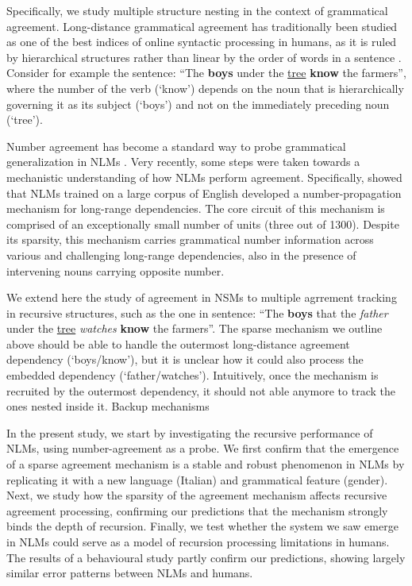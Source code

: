 Specifically, we study multiple structure nesting in the context of grammatical agreement. Long-distance grammatical agreement has traditionally been studied as one of the  best indices of online syntactic processing in humans, as it is ruled
by hierarchical structures rather than linear by the order of words in
a sentence \citep{Bock:Miller:1991, franck2002subject}. Consider for example the sentence: ``The \textbf{boys} under the \underline{tree} \textbf{know} the farmers'', where the number of the verb (`know') depends on the noun that is hierarchically governing it as its subject (`boys') and not on the immediately preceding noun (`tree').

Number agreement has become a standard way to probe grammatical
generalization in NLMs \citep{Linzen:etal:2016,Bernardy:Lappin:2017,Giulianelli:etal:2018,Gulordava:etal:2018}. Very
recently, some steps were taken towards a mechanistic understanding of
how NLMs perform agreement. Specifically, \citet{lakretz2019emergence} showed that NLMs trained
on a large corpus of English developed a number-propagation mechanism for long-range dependencies. The core circuit of this mechanism is comprised of an exceptionally small number of units (three out of 1300). Despite its sparsity, this mechanism carries grammatical number information across various and challenging long-range dependencies, also in the presence of intervening nouns carrying opposite number.

We extend here the study of agreement in NSMs to multiple agrrement tracking in recursive structures, such as the one in sentence: ``The \textbf{boys} that the \textit{father} under the \underline{tree} \textit{watches} \textbf{know} the farmers''. The sparse mechanism we outline above should be able to handle the outermost long-distance agreement dependency (`boys/know'), but it is unclear how it could also process the embedded dependency (`father/watches'). Intuitively, once the mechanism is recruited by the outermost
dependency, it should not able anymore to track the ones nested inside it.  Backup mechanisms

In the present study, we start by investigating the recursive
performance of NLMs, using number-agreement as a
probe. We first confirm that the emergence of a sparse agreement mechanism is
a stable and robust phenomenon in NLMs by replicating it with a new
language (Italian) and grammatical feature (gender). Next, we study
how the sparsity of the agreement mechanism affects recursive
agreement processing, confirming our predictions that the mechanism
strongly binds the depth of recursion. Finally, we test whether the
 system we saw emerge in NLMs could serve as a
model of recursion processing limitations in humans. The results of a
behavioural study partly confirm our predictions, showing largely similar error patterns between NLMs and humans. 


